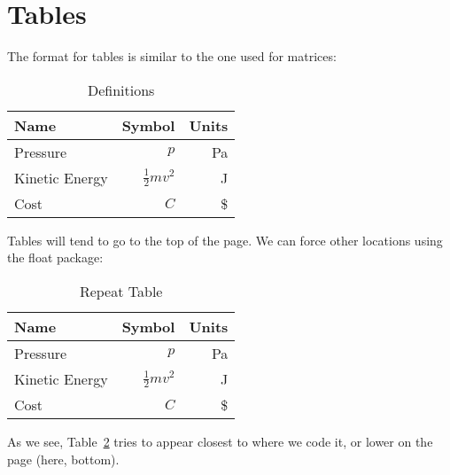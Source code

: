 \documentclass[10pt,twocolumn,letterpaper]{article} %
\begin{document}
\section{Tables}
The format for tables is similar to the one used for matrices:
\begin{table}
\begin{center}
\begin{tabular}{|l|r|r|} %
\hline %
Name & Symbol & Units \\
\hline 
Pressure & $p$ & Pa \\ %
\hline 
Kinetic Energy & $\frac{1}{2}mv^2$ & J \\
\hline
Cost & $C$ & \$  \\ %
\hline
\end{tabular} \caption{Definitions} \label{mytable} %
\end{center}
\end{table}
Tables will tend to go to the top of the page. We can force other locations using the float package:
\begin{table}[hb] %
\begin{center}
\begin{tabular}{|l|r|r|} %
\hline %
Name & Symbol & Units \\
\hline
Pressure & $p$ & Pa \\ %
\hline
Kinetic Energy & $\frac{1}{2}mv^2$ & J \\
\hline
Cost & $C$ & \$  \\ %
\hline
\end{tabular} \caption{Repeat Table} \label{myothertable} %
\end{center}
\end{table}
As we see, Table~\ref{myothertable} tries to appear closest to where we code it, or lower on the page (here, bottom). 
\end{document}
